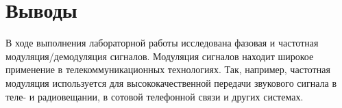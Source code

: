 \documentclass[a4paper]{article}
\begin{document}
\section{Выводы}
В ходе выполнения лабораторной работы исследована фазовая и частотная модуляция/демодуляция сигналов. Модуляция сигналов находит широкое применение в телекоммуникационных технологиях. Так, например, частотная модуляция используется для высококачественной передачи звукового сигнала в теле- и радиовещании, в сотовой телефонной связи и других системах. 
\end{document}
